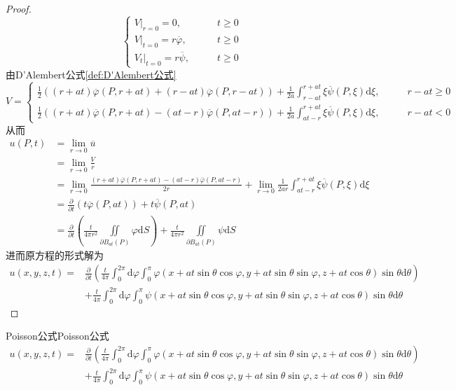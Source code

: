 \documentclass[lang = cn, scheme = chinese, thmcnt = section]{elegantbook}
\newcommand{\dd}{\mathrm{d}}           %
\newcommand{\dis}{\displaystyle}
\newcommand{\IInt}{\iint\limits}
\begin{document}
\begin{proof}
$$\begin{cases}
		V|_{r=0}=0,\qquad & t\ge 0\\
		V|_{t=0}=r\overline{\varphi},\qquad & t\ge 0\\
		V_t|_{t=0}=r\overline{\psi},\qquad & t\ge 0
	\end{cases}
	$$
	由D'Alembert公式\ref{def:D'Alembert公式}%
	$$
	V=\begin{cases}
		\dis\frac{1}{2}\left((r+at)\overline{\varphi}(P,r+at)+(r-at)\overline{\varphi}(P,r-at)\right)+\frac{1}{2a}\int_{r-at}^{r+at}\xi\overline{\psi}(P,\xi)\dd\xi,\qquad & r-at\ge 0\\
		\dis\frac{1}{2}\left((r+at)\overline{\varphi}(P,r+at)-(at-r)\overline{\varphi}(P,at-r)\right)+\frac{1}{2a}\int_{at-r}^{r+at}\xi\overline{\psi}(P,\xi)\dd\xi,\qquad & r-at< 0
	\end{cases}
	$$
	从而
	\begin{align*}
		u(P,t)
		& = \lim_{r\to 0}\overline{u}\\
		& = \lim_{r\to 0}\frac{V}{r}\\
		& = \lim_{r\to 0}\frac{(r+at)\overline{\varphi}(P,r+at)-(at-r)\overline{\varphi}(P,at-r)}{2r}+\lim_{r\to 0}\frac{1}{2ar}\int_{at-r}^{r+at}\xi\overline{\psi}(P,\xi)\dd\xi\\
		& = \frac{\partial}{\partial t}\left(t\overline{\varphi}(P,at)\right)+t\overline{\psi}(P,at)\\
		& = \frac{\partial}{\partial t}\left(\frac{t}{4\pi r^2}\IInt_{\partial B_{at}(P)}\varphi\dd S\right)+\frac{t}{4\pi r^2}\IInt_{\partial B_{at}(P)}\psi\dd S
	\end{align*}
	进而原方程的形式解为%
	\begin{align*}
		u(x,y,z,t)
		= & \frac{\partial}{\partial t}\left(\frac{t}{4\pi}\int_{0}^{2\pi}\dd\varphi\int_{0}^{\pi}\varphi(x+at\sin\theta\cos\varphi,y+at\sin\theta\sin\varphi,z+at\cos\theta)\sin\theta\dd\theta\right)\\
		& + \frac{t}{4\pi}\int_{0}^{2\pi}\dd\varphi\int_{0}^{\pi}\psi(x+at\sin\theta\cos\varphi,y+at\sin\theta\sin\varphi,z+at\cos\theta)\sin\theta\dd\theta
	\end{align*}
\end{proof}

\begin{definition}{Poisson公式}{Poisson公式}
	\begin{align*}
		u(x,y,z,t)
		= & \frac{\partial}{\partial t}\left(\frac{t}{4\pi}\int_{0}^{2\pi}\dd\varphi\int_{0}^{\pi}\varphi(x+at\sin\theta\cos\varphi,y+at\sin\theta\sin\varphi,z+at\cos\theta)\sin\theta\dd\theta\right)\\
		& + \frac{t}{4\pi}\int_{0}^{2\pi}\dd\varphi\int_{0}^{\pi}\psi(x+at\sin\theta\cos\varphi,y+at\sin\theta\sin\varphi,z+at\cos\theta)\sin\theta\dd\theta
	\end{align*}
\end{definition}
\end{document}
